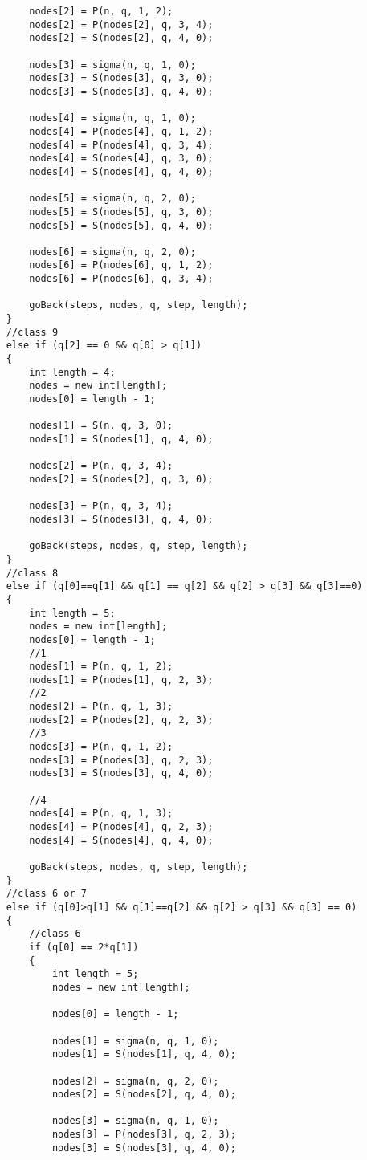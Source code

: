 \begin{lstlisting}
		nodes[2] = P(n, q, 1, 2);
		nodes[2] = P(nodes[2], q, 3, 4);
		nodes[2] = S(nodes[2], q, 4, 0);

		nodes[3] = sigma(n, q, 1, 0);
		nodes[3] = S(nodes[3], q, 3, 0);
		nodes[3] = S(nodes[3], q, 4, 0);

		nodes[4] = sigma(n, q, 1, 0);
		nodes[4] = P(nodes[4], q, 1, 2);
		nodes[4] = P(nodes[4], q, 3, 4);
		nodes[4] = S(nodes[4], q, 3, 0);
		nodes[4] = S(nodes[4], q, 4, 0);

		nodes[5] = sigma(n, q, 2, 0);
		nodes[5] = S(nodes[5], q, 3, 0);
		nodes[5] = S(nodes[5], q, 4, 0);

		nodes[6] = sigma(n, q, 2, 0);
		nodes[6] = P(nodes[6], q, 1, 2);
		nodes[6] = P(nodes[6], q, 3, 4);

		goBack(steps, nodes, q, step, length);
	}
	//class 9
	else if (q[2] == 0 && q[0] > q[1])
	{
		int length = 4;
		nodes = new int[length];
		nodes[0] = length - 1;
		
		nodes[1] = S(n, q, 3, 0);
		nodes[1] = S(nodes[1], q, 4, 0);
		
		nodes[2] = P(n, q, 3, 4);
		nodes[2] = S(nodes[2], q, 3, 0);
		
		nodes[3] = P(n, q, 3, 4);
		nodes[3] = S(nodes[3], q, 4, 0);

		goBack(steps, nodes, q, step, length);
	}
	//class 8
	else if (q[0]==q[1] && q[1] == q[2] && q[2] > q[3] && q[3]==0)
	{
		int length = 5;
		nodes = new int[length];
		nodes[0] = length - 1;
		//1
		nodes[1] = P(n, q, 1, 2);
		nodes[1] = P(nodes[1], q, 2, 3);
		//2
		nodes[2] = P(n, q, 1, 3);
		nodes[2] = P(nodes[2], q, 2, 3);
		//3
		nodes[3] = P(n, q, 1, 2);
		nodes[3] = P(nodes[3], q, 2, 3);
		nodes[3] = S(nodes[3], q, 4, 0);

		//4
		nodes[4] = P(n, q, 1, 3);
		nodes[4] = P(nodes[4], q, 2, 3);
		nodes[4] = S(nodes[4], q, 4, 0);

		goBack(steps, nodes, q, step, length);
	}
	//class 6 or 7
	else if (q[0]>q[1] && q[1]==q[2] && q[2] > q[3] && q[3] == 0)
	{
		//class 6
		if (q[0] == 2*q[1])
		{
			int length = 5;
			nodes = new int[length];

			nodes[0] = length - 1;

			nodes[1] = sigma(n, q, 1, 0);
			nodes[1] = S(nodes[1], q, 4, 0);

			nodes[2] = sigma(n, q, 2, 0);
			nodes[2] = S(nodes[2], q, 4, 0);

			nodes[3] = sigma(n, q, 1, 0);
			nodes[3] = P(nodes[3], q, 2, 3);
			nodes[3] = S(nodes[3], q, 4, 0);


\end{lstlisting}
